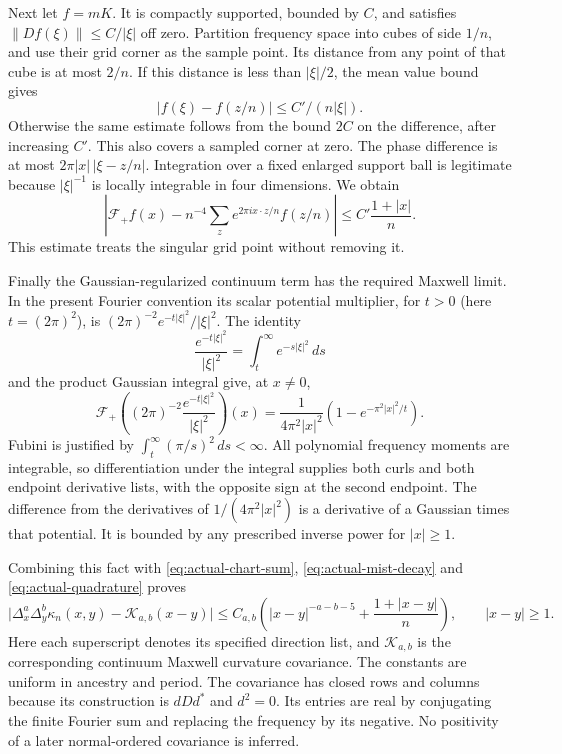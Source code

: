 Next let $f=mK$. It is compactly supported, bounded by $C$, and
satisfies $\|Df(\xi)\|\le C/|\xi|$ off zero. Partition frequency
space into cubes of side $1/n$, and use their grid corner as the
sample point. Its distance from any point of that cube is at most
$2/n$. If this distance is less than $|\xi|/2$, the mean value
bound gives
\[
 |f(\xi)-f(z/n)|\le C'/(n|\xi|).
\]
Otherwise the same estimate follows from the bound $2C$ on the
difference, after increasing $C'$. This also covers a sampled
corner at zero. The phase difference is at most
$2\pi|x|\,|\xi-z/n|$. Integration over a fixed enlarged support
ball is legitimate because $|\xi|^{-1}$ is locally integrable in
four dimensions. We obtain
\begin{equation}\label{eq:actual-quadrature}
 \left|\mathcal F_+f(x)-n^{-4}\sum_z
                e^{2\pi i x\cdot z/n}f(z/n)\right|
                  \le C'\frac{1+|x|}{n}.
\end{equation}
This estimate treats the singular grid point without removing it.

Finally the Gaussian-regularized continuum term has the required
Maxwell limit. In the present Fourier convention its scalar
potential multiplier, for $t>0$ (here $t=(2\pi)^2$), is
$(2\pi)^{-2}e^{-t|\xi|^2}/|\xi|^2$. The identity
\[
 \frac{e^{-t|\xi|^2}}{|\xi|^2}
       =\int_t^\infty e^{-s|\xi|^2}\,ds
\]
and the product Gaussian integral give, at $x\ne0$,
\[
 \mathcal F_+\left((2\pi)^{-2}
          \frac{e^{-t|\xi|^2}}{|\xi|^2}\right)(x)
 =\frac{1}{4\pi^2|x|^2}
                 \left(1-e^{-\pi^2|x|^2/t}\right).
\]
Fubini is justified by
$\int_t^\infty(\pi/s)^2\,ds<\infty$.
All polynomial frequency moments are integrable, so differentiation
under the integral supplies both curls and both endpoint derivative
lists, with the opposite sign at the second endpoint. The difference
from the derivatives of $1/(4\pi^2|x|^2)$ is a derivative of a
Gaussian times that potential. It is bounded by any prescribed
inverse power for $|x|\ge1$.

Combining this fact with \eqref{eq:actual-chart-sum},
\eqref{eq:actual-mist-decay} and \eqref{eq:actual-quadrature} proves
\begin{equation}\label{eq:actual-native-model}
 \bigl|\Delta_x^a\Delta_y^b\kappa_n(x,y)
                     -\mathcal K_{a,b}(x-y)\bigr|
 \le C_{a,b}\left(|x-y|^{-a-b-5}
                          +\frac{1+|x-y|}{n}\right),
 \qquad |x-y|\ge1.
\end{equation}
Here each superscript denotes its specified direction list, and
$\mathcal K_{a,b}$ is the corresponding continuum Maxwell curvature
covariance. The constants are uniform in ancestry and period.
The covariance has closed rows and columns because its construction
is $dDd^*$ and $d^2=0$. Its entries are real by conjugating the
finite Fourier sum and replacing the frequency by its negative.
No positivity of a later normal-ordered covariance is inferred.

